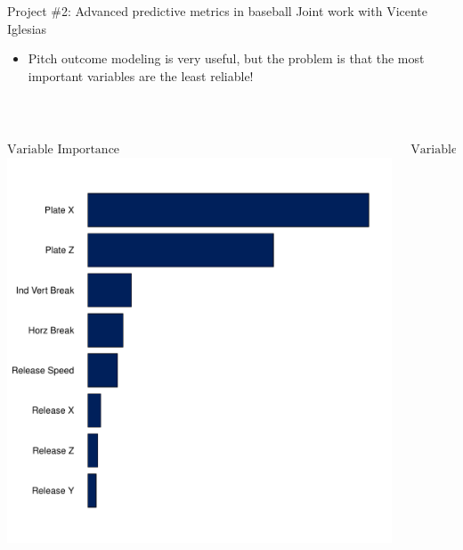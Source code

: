 \documentclass[handout]{beamer}
\begin{document}
\begin{frame}{Project \#2: Advanced predictive metrics in baseball}
  {Joint work with Vicente Iglesias}
  \begin{itemize}
    \item Pitch outcome modeling is very useful, but the problem is that the most important variables are the least reliable!
  \end{itemize}
  ~
  \begin{columns}
    \begin{column}{0.5\textwidth}
      \centering
      $\mbox{Variable Importance}$\\
      \includegraphics[width = \textwidth]{images/feature_importance.pdf}
    \end{column}
    \begin{column}{0.5\textwidth}
      \centering
      $\mbox{Variable Reliability}$\\

\end{column}
\end{columns}
\end{frame}
\end{document}
